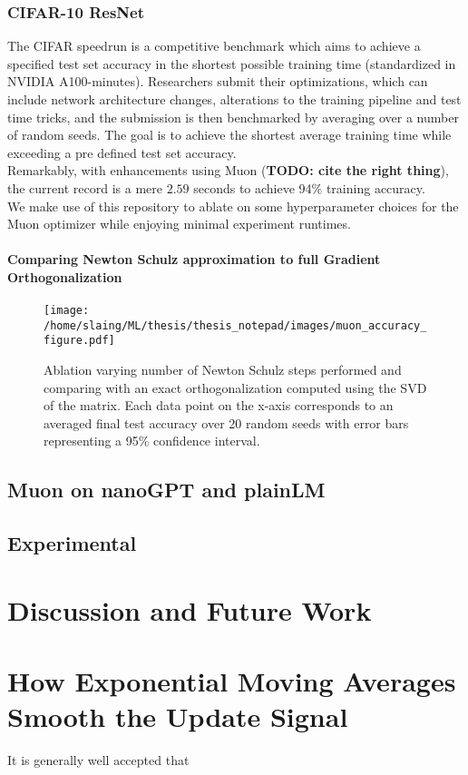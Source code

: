\documentclass[12pt]{book}
\newcommand{\todo}[1]{{\color{red}\bf{TODO: #1}}}
\begin{document}
\subsection{CIFAR-10 ResNet}
The CIFAR speedrun is a competitive benchmark which aims to achieve a specified test set accuracy in the shortest possible training time (standardized in NVIDIA A100-minutes). Researchers submit their optimizations, which can include network architecture changes, alterations to the training pipeline and test time tricks, and the submission is then benchmarked by averaging over a number of random seeds. The goal is to achieve the shortest average training time while exceeding a pre defined test set accuracy. \\
Remarkably, with enhancements using Muon (\todo{cite the right thing}), the current record is a mere $2.59$ seconds to achieve 94\% training accuracy. 
\\
We make use of this repository to ablate on some hyperparameter choices for the Muon optimizer while enjoying minimal experiment runtimes. 
\\
\subsubsection*{Comparing Newton Schulz approximation to full Gradient Orthogonalization}

\begin{figure}[htbp]
  \centering
  \texttt{[image: /home/slaing/ML/thesis/thesis\_notepad/images/muon\_accuracy\_figure.pdf]}
  \caption{Ablation varying number of Newton Schulz steps performed and comparing with an exact orthogonalization computed using the SVD of the matrix. Each data point on the x-axis corresponds to an averaged final test accuracy over 20 random seeds with error bars representing a 95\% confidence interval.   }
  \label{fig:muon_cifar_NS}
\end{figure}
\section{Muon on nanoGPT and plainLM} 
\section{Experimental }
\chapter{Discussion and Future Work}


\appendix

\chapter{How Exponential Moving Averages Smooth the Update Signal}
It is generally well accepted that  
\end{document}
